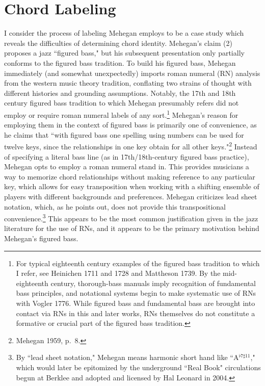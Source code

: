 \section{Chord Labeling}
I consider the process of labeling Mehegan employs to be a case study which reveals the difficulties of determining chord identity.  Mehegan's claim (2) proposes a jazz ``figured bass," but his subsequent presentation only partially conforms to the figured bass tradition.  To build his figured bass, Mehegan immediately (and somewhat unexpectedly) imports roman numeral (RN) analysis from the western music theory tradition, conflating two strains of thought with different histories and grounding assumptions.  Notably, the 17th and 18th century figured bass tradition to which Mehegan presumably refers did not employ or require roman numeral labels of any sort.\footnote{For typical eighteenth century examples of the figured bass tradition to which I refer, see Heinichen 1711 and 1728 and Mattheson 1739.  By the mid-eighteenth century, thorough-bass manuals imply recognition of fundamental bass principles, and notational systems begin to make systematic use of RNs with Vogler 1776.  While figured bass and fundamental bass are brought into contact via RNs in this and later works, RNs themselves do not constitute a formative or crucial part of the figured bass tradition.}  Mehegan's reason for employing them in the context of figured bass is primarily one of convenience, as he claims that ``with figured bass one spelling using numbers can be used for twelve keys, since the relationships in one key obtain  for all other keys."\footnote{Mehegan 1959, p.\ 8.}  Instead of specifying a literal bass line (as in 17th/18th-century figured bass practice), Mehegan opts to employ a roman numeral stand in.  This provides musicians a way to memorize chord relationships without making reference to any particular key, which allows for easy transposition when working with a shifting ensemble of players with different backgrounds and preferences.  Mehegan criticizes lead sheet notation, which, as he points out, does not provide this transpositional convenience.\footnote{By ``lead sheet notation," Mehegan means harmonic short hand like ``A$^{\flat 7 \sharp 11}$," which would later be epitomized by the underground ``Real Book" circulations begun at Berklee and adopted and licensed by Hal Leonard in 2004.}  This appears to be the most common justification given in the jazz literature for the use of RNs, and it appears to be the primary motivation behind Mehegan's figured bass.

